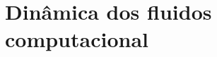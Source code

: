 \documentclass[tese_patricia]{subfiles}%
\begin{document}

\chapter[Dinâmica dos fluidos computacional]{Dinâmica dos fluidos computacional}
\label{capitulo:Cap1}
\end{document}

